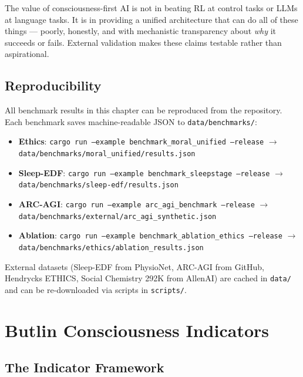 \documentclass[12pt]{book}
\begin{document}
The value of consciousness-first AI is not in beating RL at control tasks or LLMs at language tasks. It is in providing a unified architecture that can do all of these things --- poorly, honestly, and with mechanistic transparency about \textit{why} it succeeds or fails. External validation makes these claims testable rather than aspirational.

\section{Reproducibility}

All benchmark results in this chapter can be reproduced from the repository. Each benchmark saves machine-readable JSON to \texttt{data/benchmarks/}:

\begin{itemize}
  \item \textbf{Ethics}: \texttt{cargo run --example benchmark\_moral\_unified --release} $\to$ \texttt{data/benchmarks/moral\_unified/results.json}
  \item \textbf{Sleep-EDF}: \texttt{cargo run --example benchmark\_sleepstage --release} $\to$ \texttt{data/benchmarks/sleep-edf/results.json}
  \item \textbf{ARC-AGI}: \texttt{cargo run --example arc\_agi\_benchmark --release} $\to$ \texttt{data/benchmarks/external/arc\_agi\_synthetic.json}
  \item \textbf{Ablation}: \texttt{cargo run --example benchmark\_ablation\_ethics --release} $\to$ \texttt{data/benchmarks/ethics/ablation\_results.json}
\end{itemize}

External datasets (Sleep-EDF from PhysioNet, ARC-AGI from GitHub, Hendrycks ETHICS, Social Chemistry 292K from AllenAI) are cached in \texttt{data/} and can be re-downloaded via scripts in \texttt{scripts/}.


\chapter{Butlin Consciousness Indicators}
\label{ch:butlin}

\section{The Indicator Framework}
\end{document}
